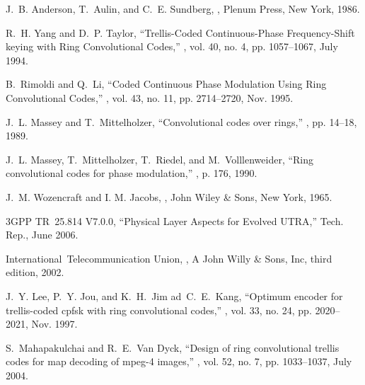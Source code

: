 \documentclass[12pt,twoside,onecolumn,a4paper,english]{IEEEtran2e}
\begin{document}
%
%
%
\begin{thebibliography}{10}

J.~B. Anderson, T.~Aulin, and C.~E. Sundberg,
,
\newblock Plenum Press, New York, 1986.

R.~H. Yang and D.~P. Taylor,
\newblock ``{Trellis-Coded Continuous-Phase Frequency-Shift keying with Ring
  Convolutional Codes},''
, vol. 40, no. 4, pp. 1057--1067,
  July 1994.

B.~Rimoldi and Q.~Li,
\newblock ``{Coded Continuous Phase Modulation Using Ring Convolutional
  Codes},''
, vol. 43, no. 11, pp. 2714--2720, Nov.
  1995.

J.~L. Massey and T.~Mittelholzer,
\newblock ``Convolutional codes over rings,''
,
  pp. 14--18, 1989.

J.~L. Massey, T.~Mittelholzer, T.~Riedel, and M.~Volllenweider,
\newblock ``Ring convolutional codes for phase modulation,''
, p. 176, 1990.

J.~M. Wozencraft and {I. M. Jacobs},
,
\newblock John {W}iley \& {S}ons, New {Y}ork, 1965.

3GPP TR~25.814 V7.0.0,
\newblock ``{Physical Layer Aspects for Evolved UTRA},''
\newblock Tech. {R}ep., June 2006.

International~Telecommunication Union,
,
\newblock A John Willy \& Sons, Inc, third edition, 2002.

J.~Y. Lee, P.~Y. Jou, and K.~H.~Jim ad~C.~E.~Kang,
\newblock ``Optimum encoder for trellis-coded cpfsk with ring convolutional
  codes,''
, vol. 33, no. 24, pp. 2020--2021, Nov.
  1997.

S.~Mahapakulchai and R.~E.~Van Dyck,
\newblock ``Design of ring convolutional trellis codes for map decoding of
  mpeg-4 images,''
, vol. 52, no. 7, pp. 1033--1037, July 2004.


\end{thebibliography}
\end{document}
